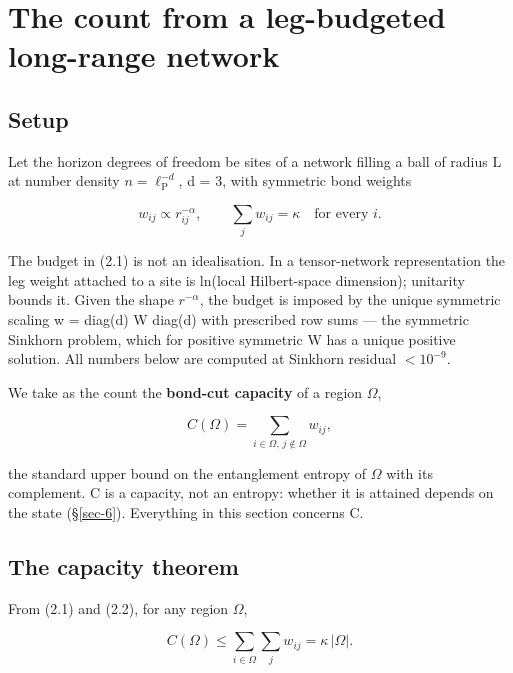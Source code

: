 \documentclass[aps,prd,preprint,nofootinbib,superscriptaddress]{revtex4-2}
\begin{document}
\section{The count from a leg-budgeted long-range network}\label{sec-2}

\subsection{Setup}\label{sec-2-1}

Let the horizon degrees of freedom be sites of a network filling a ball
of radius L at number density \(n = \ell _{\mathrm{P}}^{-d}\), d = 3,
with symmetric bond weights

\begin{equation}w_{ij} \propto r_{ij}^{-\alpha}, \qquad \sum_j w_{ij} = \kappa \quad\text{for every } i. \tag{2.1}\end{equation}

The budget in (2.1) is not an idealisation. In a tensor-network
representation the leg weight attached to a site is ln(local
Hilbert-space dimension); unitarity bounds it. Given the shape
\(r^{-\alpha }\), the budget is imposed by the unique symmetric scaling
w = diag(d) W diag(d) with prescribed row sums --- the symmetric
Sinkhorn problem, which for positive symmetric W has a unique positive
solution. All numbers below are computed at Sinkhorn residual
\(< 10^{-9}\).

We take as the count the \textbf{bond-cut capacity} of a region
\(\Omega\),

\begin{equation}C(\Omega) = \sum_{i\in\Omega,\, j\notin\Omega} w_{ij}, \tag{2.2}\end{equation}

the standard upper bound on the entanglement entropy of \(\Omega\) with
its complement. C is a capacity, not an entropy: whether it is attained
depends on the state (§\ref{sec-6}). Everything in this section concerns
C.

\subsection{The capacity theorem}\label{sec-2-2}

From (2.1) and (2.2), for any region \(\Omega\),

\begin{equation}C(\Omega) \le \sum_{i\in\Omega} \sum_j w_{ij} = \kappa\,|\Omega|. \tag{2.3}\end{equation}
\end{document}
